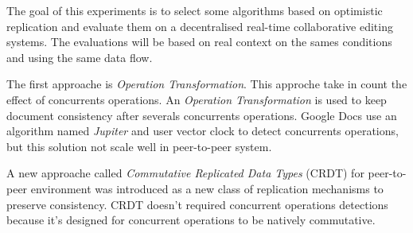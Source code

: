  The goal of this experiments is to select some algorithms based on optimistic replication and evaluate them on a decentralised real-time collaborative editing systems. The evaluations will be based on real context on the sames conditions and using the same data flow.

The first approache is \emph{Operation Transformation}. This approche take in count the effect of concurrents operations. An \emph{Operation Transformation} is used to keep document consistency after severals concurrents operations. Google Docs use an algorithm named \emph{Jupiter} and user vector clock to detect concurrents operations, but this solution not scale well in peer-to-peer system.

A new approache called \emph{Commutative Replicated Data Types} (CRDT) for peer-to-peer environment was introduced as a new class of replication mechanisms to preserve consistency. CRDT doesn't required concurrent operations detections because it's designed for concurrent operations to be natively commutative.